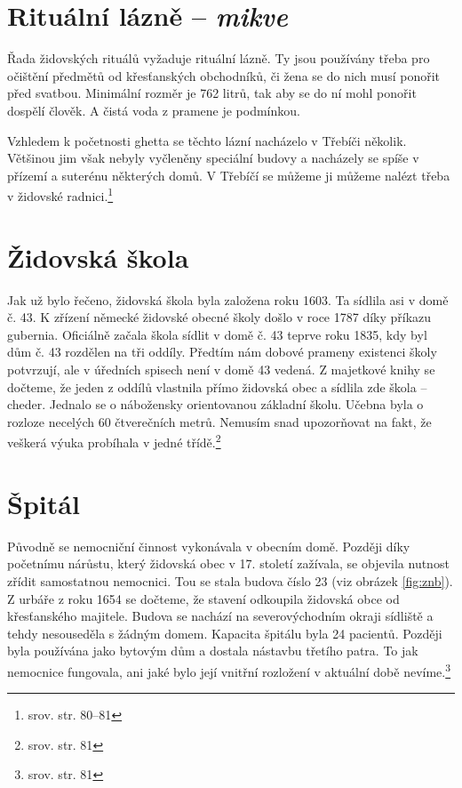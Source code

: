 \documentclass[a4paper,oneside,12pt]{report}
\begin{document}
\section{Rituální lázně -- \textit{mikve}}

Řada židovských rituálů vyžaduje rituální lázně.
Ty jsou používány třeba pro očištění předmětů od křesťanských obchodníků, či žena se do nich musí ponořit před svatbou.
Minimální rozměr je 762 litrů, tak aby se do ní mohl ponořit dospělí člověk.
A čistá voda z pramene je podmínkou.

Vzhledem k početnosti ghetta se těchto lázní nacházelo v Třebíči několik.
Většinou jim však nebyly vyčleněny speciální budovy a nacházely se spíše v přízemí a suterénu některých domů.
V Třebíčí se můžeme ji můžeme nalézt třeba v židovské radnici.\footnote{srov. \cite{Fiser2005} str. 80--81}

\section{Židovská škola}

Jak už bylo řečeno, židovská škola byla založena roku 1603.
Ta sídlila asi v domě č. 43.
K zřízení německé židovské obecné školy došlo v roce 1787 díky příkazu gubernia.
Oficiálně začala škola sídlit v domě č. 43 teprve roku 1835, kdy byl dům č. 43 rozdělen na tři oddíly.
Předtím nám dobové prameny existenci školy potvrzují, ale v úředních spisech není v domě 43 vedená.
Z majetkové knihy se dočteme, že jeden z oddílů vlastnila přímo židovská obec a sídlila zde škola -- cheder.
Jednalo se o nábožensky orientovanou základní školu.
Učebna byla o rozloze necelých 60 čtverečních metrů.
Nemusím snad upozorňovat na fakt, že veškerá výuka probíhala v jedné třídě.\footnote{srov. \cite{Fiser2005} str. 81}

\section{Špitál}

Původně se nemocniční činnost vykonávala v obecním domě.
Později díky početnímu nárůstu, který židovská obec v 17. století zažívala, se objevila nutnost zřídit samostatnou nemocnici.
Tou se stala budova číslo 23 (viz obrázek \ref{fig:znb}).
Z urbáře z roku 1654 se dočteme, že stavení odkoupila židovská obce od křesťanského majitele.
Budova se nachází na severovýchodním okraji sídliště a tehdy nesouseděla s žádným domem.
Kapacita špitálu byla 24 pacientů.
Později byla používána jako bytovým dům a dostala nástavbu třetího patra.
To jak nemocnice fungovala, ani jaké bylo její vnitřní rozložení v aktuální době nevíme.\footnote{srov. \cite{Fiser2005} str. 81}
\end{document}
